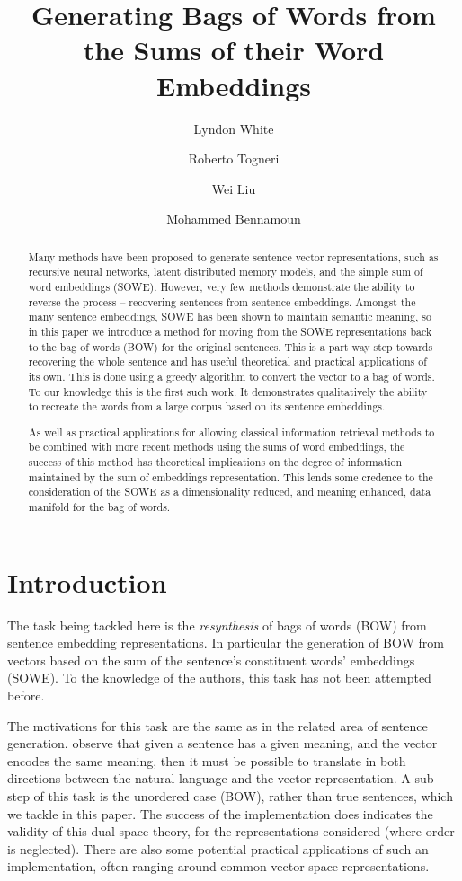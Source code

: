 \documentclass{llncs}
\title{Generating Bags of Words from the Sums of their Word Embeddings}
\author{Lyndon White \and Roberto Togneri \and Wei Liu \and Mohammed Bennamoun}
\institute{The University of Western Australia\\
	35 Stirling Highway, Crawley, Western Australia \\
	\email{lyndon.white@research.uwa.edu.au}, 
	\email{roberto.togneri@uwa.edu.au},
	\email{wei.liu@uwa.edu.au},
	 \email{mohammed.bennamoun@uwa.edu.au}
	}
\begin{document}
%
\maketitle
%
\begin{abstract}
Many methods have been proposed to generate sentence vector representations, such as recursive neural networks, latent distributed memory models, and the simple sum of word embeddings (SOWE). However,  very few methods demonstrate the ability to reverse the process -- recovering sentences from sentence embeddings. Amongst the many sentence embeddings, SOWE has been shown to maintain semantic meaning, so in this paper we introduce a method for moving from the SOWE representations back to the bag of words (BOW) for the original sentences. This is a part way step towards recovering the whole sentence and has useful theoretical and practical applications of its own. This is done using a greedy algorithm to convert the vector to a bag of words. To our knowledge this is the first such work. It demonstrates qualitatively the ability to recreate the words from a large corpus based on its sentence embeddings.

As well as practical applications for allowing classical information retrieval methods to be combined with more recent methods using the sums of word embeddings, the success of this method has theoretical implications on the degree of information maintained by the sum of embeddings representation. This lends some credence to the consideration of the SOWE as a dimensionality reduced, and meaning enhanced, data manifold for the bag of words.  
\end{abstract}

\section{Introduction} \label{intro}

The task being tackled here is the \emph{resynthesis} of bags of words (BOW) from sentence embedding representations. In particular the generation of BOW from vectors based on the sum of the sentence's constituent words' embeddings (SOWE). To the knowledge of the authors, this task has not been attempted before.

The motivations for this task are the same as in the related area of sentence generation. \textcite{Dinu2014CompositionalGeneration} observe that given  a sentence has a given meaning, and the vector encodes the same meaning, then it must be possible to translate in both directions between the natural language and the vector representation. A sub-step of this task is the unordered case (BOW), rather than true sentences, which we tackle in this paper. The success of the implementation does indicates the validity of this dual space theory, for the representations considered (where order is neglected).  There are also some potential practical applications of such an implementation, often ranging around common vector space representations.
\end{document}
